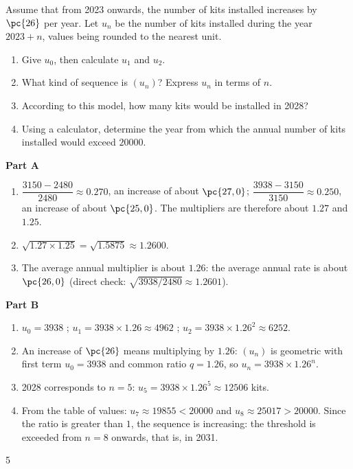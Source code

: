{Assume that from 2023 onwards, the number of kits installed increases by $\pc{26}$ per year. Let $u_n$ be the number of kits installed during the year $2023+n$, values being rounded to the nearest unit.
\begin{enumerate}
\item Give $u_0$, then calculate $u_1$ and $u_2$.
\item What kind of sequence is $(u_n)$? Express $u_n$ in terms of $n$.
\item According to this model, how many kits would be installed in 2028?
\item Using a calculator, determine the year from which the annual number of kits installed would exceed $\num{20000}$.
\end{enumerate}
}{%
\textbf{Part A}
\begin{enumerate}
\item $\dfrac{\num{3150}-\num{2480}}{\num{2480}}\approx\num{0,270}$, an increase of about $\pc{27,0}$; $\dfrac{\num{3938}-\num{3150}}{\num{3150}}\approx\num{0,250}$, an increase of about $\pc{25,0}$. The multipliers are therefore about $\num{1,27}$ and $\num{1,25}$.
\item $\sqrt{\num{1,27}\times\num{1,25}}=\sqrt{\num{1,5875}}\approx\num{1,2600}$.
\item The average annual multiplier is about $\num{1,26}$: the average annual rate is about $\pc{26,0}$ (direct check: $\sqrt{\num{3938}/\num{2480}}\approx\num{1,2601}$).
\end{enumerate}
\textbf{Part B}
\begin{enumerate}
\item $u_0=\num{3938}$ ; $u_1=\num{3938}\times\num{1,26}\approx\num{4962}$ ; $u_2=\num{3938}\times\num{1,26}^2\approx\num{6252}$.
\item An increase of $\pc{26}$ means multiplying by $\num{1,26}$: $(u_n)$ is geometric with first term $u_0=\num{3938}$ and common ratio $q=\num{1,26}$, so $u_n=\num{3938}\times\num{1,26}^n$.
\item 2028 corresponds to $n=5$: $u_5=\num{3938}\times\num{1,26}^5\approx\num{12506}$ kits.
\item From the table of values: $u_7\approx\num{19855}<\num{20000}$ and $u_8\approx\num{25017}>\num{20000}$. Since the ratio is greater than $1$, the sequence is increasing: the threshold is exceeded from $n=8$ onwards, that is, in 2031.
\end{enumerate}
}{5}

